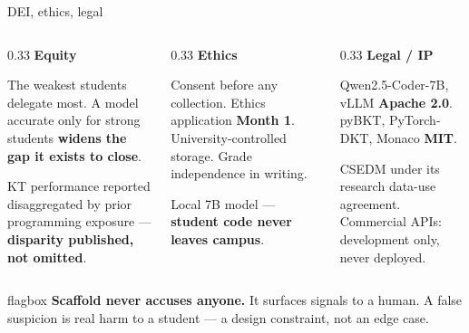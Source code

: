 \documentclass[aspectratio=169,11pt]{beamer}
\newcommand{\punchflag}[1]{%
  \vfill
  \begin{beamercolorbox}[wd=\textwidth,sep=5pt,rounded=true]{flagbox}
    \centering\small #1
  \end{beamercolorbox}%
}
\newcommand{\lead}[1]{\textbf{\color{accent}#1}}
\begin{document}
\begin{frame}{DEI, ethics, legal}
  \vspace{0.6em}
  \begin{columns}[T]
    \begin{column}{0.33\textwidth}
      \lead{Equity}\par\vspace{0.3em}
      {\footnotesize The weakest students delegate most. A model accurate only for strong
      students \textbf{widens the gap it exists to close}.\par\vspace{0.4em}
      {\footnotesize\color{muted}KT performance reported disaggregated by prior programming
      exposure --- \textbf{disparity published, not omitted}.}}
    \end{column}
    \begin{column}{0.33\textwidth}
      \lead{Ethics}\par\vspace{0.3em}
      {\footnotesize Consent before any collection. Ethics application \textbf{Month 1}.
      University-controlled storage. Grade independence in writing.\par\vspace{0.4em}
      {\footnotesize\color{muted}Local 7B model --- \textbf{student code never leaves campus}.}}
    \end{column}
    \begin{column}{0.33\textwidth}
      \lead{Legal / IP}\par\vspace{0.3em}
      {\footnotesize Qwen2.5-Coder-7B, vLLM \textbf{Apache 2.0}. pyBKT, PyTorch-DKT, Monaco
      \textbf{MIT}.\par\vspace{0.4em}
      {\footnotesize\color{muted}CSEDM under its research data-use agreement. Commercial
      APIs: development only, never deployed.}}
    \end{column}
  \end{columns}
  \punchflag{\textbf{Scaffold never accuses anyone.} It surfaces signals to a human. A false suspicion is real harm to a student --- a design constraint, not an edge case.}
\end{frame}
\end{document}
